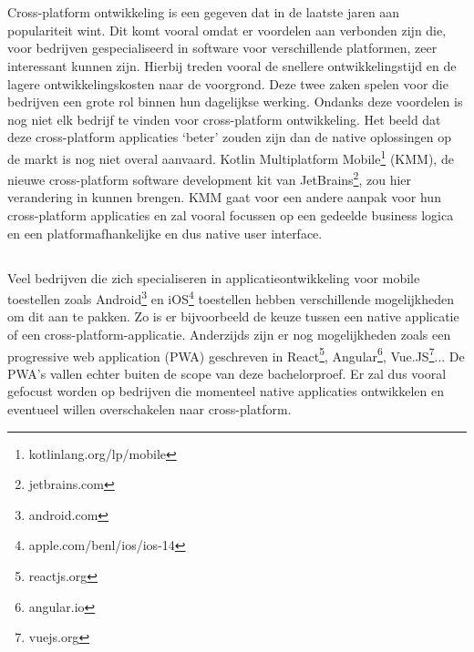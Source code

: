 
\chapter{}
\label{ch:inleiding}

Cross-platform ontwikkeling is een gegeven dat in de laatste jaren aan populariteit wint. Dit komt vooral omdat er voordelen aan verbonden zijn die, voor bedrijven gespecialiseerd in software voor verschillende platformen, zeer interessant kunnen zijn. Hierbij treden vooral de snellere ontwikkelingstijd en de lagere ontwikkelingskosten naar de voorgrond. Deze twee zaken spelen voor die bedrijven een grote rol binnen hun dagelijkse werking. Ondanks deze voordelen is nog niet elk bedrijf te vinden voor cross-platform ontwikkeling. Het beeld dat deze cross-platform applicaties `beter' zouden zijn dan de native oplossingen op de markt is nog niet overal aanvaard. Kotlin Multiplatform Mobile\footnote{kotlinlang.org/lp/mobile} (KMM), de nieuwe cross-platform software development kit van JetBrains\footnote{jetbrains.com}, zou hier verandering in kunnen brengen. KMM gaat voor een andere aanpak voor hun cross-platform applicaties en zal vooral focussen op een gedeelde business logica en een platformafhankelijke en dus native user interface. 


\section{}
\label{sec:probleemstelling}

Veel bedrijven die zich specialiseren in applicatieontwikkeling voor mobile toestellen zoals Android\footnote{android.com} en iOS\footnote{apple.com/benl/ios/ios-14} toestellen hebben verschillende mogelijkheden om dit aan te pakken. Zo is er bijvoorbeeld de keuze tussen een native applicatie of een cross-platform-applicatie. Anderzijds zijn er nog mogelijkheden zoals een progressive web application (PWA) geschreven in React\footnote{reactjs.org}, Angular\footnote{angular.io}, Vue.JS\footnote{vuejs.org}... De PWA's vallen echter buiten de scope van deze bachelorproef. Er zal dus vooral gefocust worden op bedrijven die momenteel native applicaties ontwikkelen en eventueel willen overschakelen naar cross-platform.


